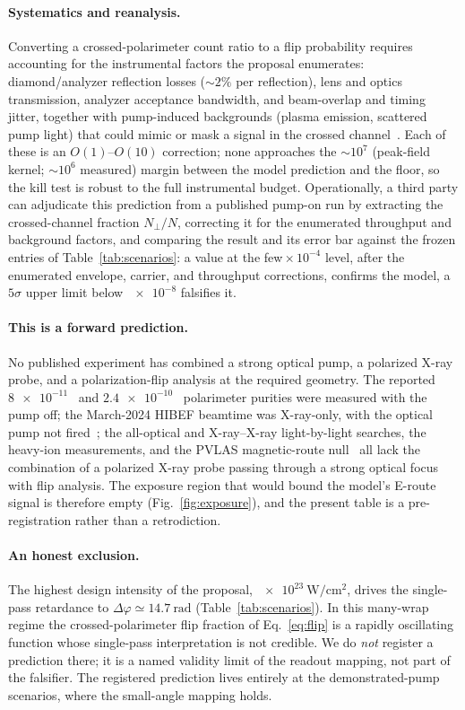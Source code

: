 \documentclass[aps,prd,twocolumn,superscriptaddress,nofootinbib,longbibliography]{revtex4-2}
\begin{document}
\paragraph*{Systematics and reanalysis.}
Converting a crossed-polarimeter count ratio to a flip probability requires
accounting for the instrumental factors the proposal enumerates: diamond/analyzer
reflection losses ($\sim\!2\%$ per reflection), lens and optics transmission,
analyzer acceptance bandwidth, and beam-overlap and timing jitter, together with
pump-induced backgrounds (plasma emission, scattered pump light) that could mimic
or mask a signal in the crossed channel~\cite{BirefHibefLoI2025,Karbstein2021}.
Each of these is an $O(1)$--$O(10)$ correction; none approaches the $\sim\!10^7$
(peak-field kernel; $\sim\!10^6$ measured) margin between the model prediction and
the floor, so the kill test is robust to the full instrumental budget. Operationally, a third party can adjudicate this
prediction from a published pump-on run by extracting the crossed-channel fraction
$N_\perp/N$, correcting it for the enumerated throughput and background factors,
and comparing the result and its error bar against the frozen entries of
Table~\ref{tab:scenarios}: a value at the few\,$\times\,10^{-4}$ level, after the
enumerated envelope, carrier, and throughput corrections, confirms the model, a
$5\sigma$ upper limit below $\num{e-8}$ falsifies it.

\paragraph*{This is a forward prediction.}
No published experiment has combined a strong optical pump, a polarized X-ray
probe, and a polarization-flip analysis at the required geometry. The reported
$\num{8e-11}$~\cite{Karbstein2021} and $\num{2.4e-10}$~\cite{Marx2013} polarimeter
purities were measured with the pump off; the March-2024 HIBEF beamtime was
X-ray-only, with the optical pump not fired~\cite{BirefHibefLoI2025}; the
all-optical and X-ray--X-ray light-by-light searches, the heavy-ion
measurements, and the PVLAS magnetic-route null~\cite{Ejlli2020} all lack the
combination of a polarized X-ray probe passing through a strong optical focus
with flip analysis. The exposure region that would bound the model's E-route
signal is therefore empty (Fig.~\ref{fig:exposure}), and the present table is a
pre-registration rather than a retrodiction.

\paragraph*{An honest exclusion.}
The highest design intensity of the proposal,
$\SI{e23}{\watt\per\centi\meter\squared}$, drives the single-pass retardance to
$\Delta\varphi\simeq\SI{14.7}{\radian}$ (Table~\ref{tab:scenarios}). In this
many-wrap regime the crossed-polarimeter flip fraction of Eq.~\eqref{eq:flip} is
a rapidly oscillating function whose single-pass interpretation is not credible.
We do \emph{not} register a prediction there; it is a named validity limit of
the readout mapping, not part of the falsifier. The registered prediction lives
entirely at the demonstrated-pump scenarios, where the small-angle mapping
holds.
\end{document}
